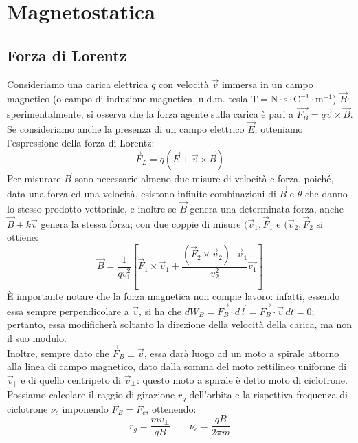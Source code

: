 \section{Magnetostatica}

\subsection{Forza di Lorentz}

Consideriamo una carica elettrica $ q $ con velocità $ \vec{v} $ immersa in un campo magnetico (o campo di induzione magnetica, u.d.m. tesla $ \text{T} = \text{N}\cdot\text{s}\cdot\text{C}^{-1}\cdot\text{m}^{-1} $) $ \vec{B} $: sperimentalmente, si osserva che la forza agente sulla carica è pari a $ \vec{F_B} = q \vec{v}\times\vec{B} $.\\
%
Se consideriamo anche la presenza di un campo elettrico $ \vec{E} $, otteniamo l'espressione della forza di Lorentz:
\begin{equation}
	\vec{F}_L = q ( \vec{E} + \vec{v} \times \vec{B} )
	\label{eq:f-lotentz}
\end{equation}
Per misurare $ \vec{B} $ sono necessarie almeno due misure di velocità e forza, poiché, data una forza ed una velocità, esistono infinite combinazioni di $ \vec{B} $ e $ \theta $ che danno lo stesso prodotto vettoriale, e inoltre se $ \vec{B} $ genera una determinata forza, anche $ \vec{B} + k\vec{v} $ genera la stessa forza; con due coppie di misure $ (\vec{v}_1, \vec{F}_1 $ e $ (\vec{v}_2, \vec{F}_2 $ si ottiene:
\begin{equation}
	\vec{B} = \displaystyle\frac{1}{qv_1^2} \left[ \vec{F}_1 \times \vec{v}_1 + \displaystyle\frac{(\vec{F}_2 \times \vec{v}_2) \cdot \vec{v}_1}{v_2^2} \vec{v_1} \right]
	\label{eq:}
\end{equation}
%
È importante notare che la forza magnetica non compie lavoro: infatti, essendo essa sempre perpendicolare a $ \vec{v} $, si ha che $ dW_B = \vec{F_B} \cdot d\vec{l} = \vec{F_B} \cdot \vec{v} \, dt = 0$; pertanto, essa modificherà soltanto la direzione della velocità della carica, ma non il suo modulo.\\
%
Inoltre, sempre dato che $ \vec{F}_B \perp \vec{v} $, essa darà luogo ad un moto a spirale attorno alla linea di campo magnetico, dato dalla somma del moto rettilineo uniforme di $ \vec{v}_{\parallel} $ e di quello centripeto di $ \vec{v}_{\perp} $: questo moto a spirale è detto moto di ciclotrone. Possiamo calcolare il raggio di girazione $ r_g $ dell'orbita e la rispettiva frequenza di ciclotrone $ \nu_c $ imponendo $ F_B = F_c $, ottenendo:
\begin{equation}
	r_g = \displaystyle\frac{m v_{\perp}}{q B} \qquad \nu_c = \displaystyle\frac{q B}{2\pi m}
	\label{eq:eq-ciclotrone}
\end{equation}

